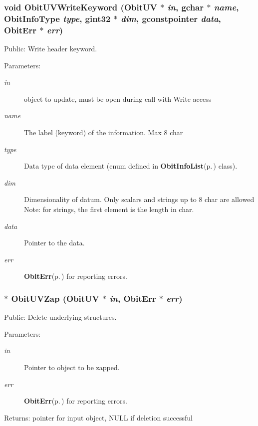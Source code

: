 \subsubsection{\setlength{\rightskip}{0pt plus 5cm}void Obit\-UVWrite\-Keyword ({\bf Obit\-UV} $\ast$ {\em in}, gchar $\ast$ {\em name}, Obit\-Info\-Type {\em type}, gint32 $\ast$ {\em dim}, gconstpointer {\em data}, {\bf Obit\-Err} $\ast$ {\em err})}\label{ObitUV_8c_a39}


Public: Write header keyword. 

\begin{Desc}
\item[Parameters:]
\begin{description}
\item[{\em in}]object to update, must be open during call with Write access \item[{\em name}]The label (keyword) of the information. Max 8 char \item[{\em type}]Data type of data element (enum defined in {\bf Obit\-Info\-List}{\rm (p.\,\pageref{structObitInfoList})} class). \item[{\em dim}]Dimensionality of datum. Only scalars and strings up to 8 char are allowed Note: for strings, the first element is the length in char. \item[{\em data}]Pointer to the data. \item[{\em err}]{\bf Obit\-Err}{\rm (p.\,\pageref{structObitErr})} for reporting errors. \end{description}
\end{Desc}
\subsubsection{$\ast$ Obit\-UVZap ({\bf Obit\-UV} $\ast$ {\em in}, {\bf Obit\-Err} $\ast$ {\em err})}\label{ObitUV_8c_a16}


Public: Delete underlying structures. 

\begin{Desc}
\item[Parameters:]
\begin{description}
\item[{\em in}]Pointer to object to be zapped. \item[{\em err}]{\bf Obit\-Err}{\rm (p.\,\pageref{structObitErr})} for reporting errors. \end{description}
\end{Desc}
\begin{Desc}
\item[Returns:]pointer for input object, NULL if deletion successful \end{Desc}
